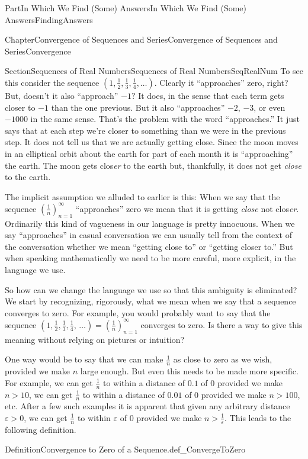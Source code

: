 \documentclass[oneside,10pt,]{book}
\numberwithin{equation}{part}
\newcommand{\eps}{\varepsilon}
\begin{document}
\begin{partptx}{Part}{In Which We Find (Some) Answers}{}{In Which We Find (Some) Answers}{}{}{FindingAnswers}
\begin{chapterptx}{Chapter}{Convergence of Sequences and Series}{}{Convergence of Sequences and Series}{}{}{Convergence}
\begin{sectionptx}{Section}{Sequences of Real Numbers}{}{Sequences of Real Numbers}{}{}{SeqRealNum}
To see this consider the sequence \(\left(1,\frac12,\frac13,\frac14,\ldots\right)\).  Clearly it ``approaches'' zero, right?  But, doesn't it also ``approach'' \(-1?\) It does, in the sense that each term gets closer to \(-1\) than the one previous.  But it also ``approaches'' \(-2\), \(-3\), or even \(-1000\) in the same sense.  That's the problem with the word ``approaches.'' It just says that at each step we're closer to something than we were in the previous step.  It does not tell us that we are actually getting close.  Since the moon moves in an elliptical orbit about the earth for part of each month it is ``approaching'' the earth.  The moon gets clos\emph{er} to the earth but, thankfully, it does not get \emph{close} to the earth.%
\par
The implicit assumption we alluded to earlier is this: When we say that the sequence \(\left(\frac1n\right)_{n=1}^\infty\) ``approaches'' zero we mean that it is getting \emph{close} not clos\emph{er}.  Ordinarily this kind of vagueness in our language is pretty innocuous.  When we say ``approaches'' in casual conversation we can usually tell from the context of the conversation whether we mean ``getting close to'' or ``getting closer to.'' But when speaking mathematically we need to be more careful, more explicit, in the language we use.%
\par
So how can we change the language we use so that this ambiguity is eliminated?  We start by recognizing, rigorously, what we mean when we say that a sequence converges to zero.  For example, you would probably want to say that the sequence \(\left(1,\frac{1}{2},\frac{1}{3},\frac{1}{4},\,\ldots\right)=\left(
\frac{1}{n}\right)_{n=1}^\infty\) converges to zero.  Is there a way to give this meaning without relying on pictures or intuition?%
\par
One way would be to say that we can make \(\frac{1}{n}\) as close to zero as we wish, provided we make \(n\) large enough.  But even this needs to be made more specific.  For example, we can get \(\frac{1}{n}\) to within a distance of \(0.1\) of \(0\) provided we make \(n>10\), we can get \(\frac{1}{n}\) to within a distance of \(0.01\) of \(0\) provided we make \(n>100\), etc.  After a few such examples it is apparent that given any arbitrary distance \(\eps>0\), we can get \(\frac{1}{n}\) to within \(\eps\) of \(0\) provided we make \(n>\frac{1}{\eps}\).  This leads to the following definition.%
\begin{definition}{Definition}{Convergence to Zero of a Sequence.}{def_ConvergeToZero}%

\end{definition}
\end{sectionptx}
\end{chapterptx}
\end{partptx}
\end{document}
